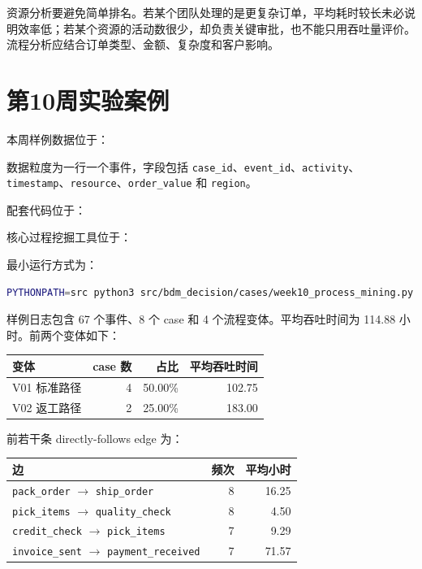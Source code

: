 \documentclass[UTF8,fontset=fandol,openany,zihao=-4]{ctexbook}
\begin{document}
资源分析要避免简单排名。若某个团队处理的是更复杂订单，平均耗时较长未必说明效率低；若某个资源的活动数很少，却负责关键审批，也不能只用吞吐量评价。流程分析应结合订单类型、金额、复杂度和客户影响。

\section{第10周实验案例}

本周样例数据位于：
\begin{center}
\end{center}
数据粒度为一行一个事件，字段包括 \texttt{case\_id}、\texttt{event\_id}、\texttt{activity}、\texttt{timestamp}、\texttt{resource}、\texttt{order\_value} 和 \texttt{region}。

配套代码位于：
\begin{center}
\end{center}
核心过程挖掘工具位于：
\begin{center}
\end{center}

最小运行方式为：
\begin{lstlisting}[language=bash,caption={运行第10周过程挖掘案例}]
PYTHONPATH=src python3 src/bdm_decision/cases/week10_process_mining.py
\end{lstlisting}

样例日志包含 67 个事件、8 个 case 和 4 个流程变体。平均吞吐时间为 114.88 小时。前两个变体如下：
\begin{center}
\begin{tabular}{lrrr}
\toprule
变体 & case 数 & 占比 & 平均吞吐时间\\
\midrule
V01 标准路径 & 4 & 50.00\% & 102.75\\
V02 返工路径 & 2 & 25.00\% & 183.00\\
\bottomrule
\end{tabular}
\end{center}

前若干条 directly-follows edge 为：
\begin{center}
\begin{tabular}{lrr}
\toprule
边 & 频次 & 平均小时\\
\midrule
\texttt{pack\_order} \(\rightarrow\) \texttt{ship\_order} & 8 & 16.25\\
\texttt{pick\_items} \(\rightarrow\) \texttt{quality\_check} & 8 & 4.50\\
\texttt{credit\_check} \(\rightarrow\) \texttt{pick\_items} & 7 & 9.29\\
\texttt{invoice\_sent} \(\rightarrow\) \texttt{payment\_received} & 7 & 71.57\\
\bottomrule
\end{tabular}
\end{center}
\end{document}
